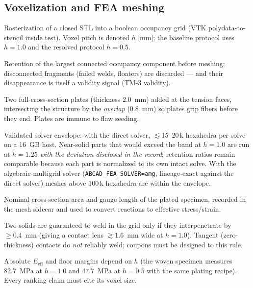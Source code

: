 \documentclass[11pt]{article}
\begin{document}
\subsection{Voxelization and FEA meshing}
\begin{description}[style=nextline,itemsep=0.35em]
  \item[Image-stencil voxelization] Rasterization of a closed STL into a boolean occupancy
    grid (VTK polydata-to-stencil inside test). Voxel pitch is denoted $h$ [mm]; the baseline
    protocol uses $h=1.0$ and the resolved protocol $h=0.5$.
  \item[Keep-largest clean] Retention of the largest connected occupancy component before
    meshing; disconnected fragments (failed welds, floaters) are discarded --- and their
    disappearance is itself a validity signal (TM-3 validity).
  \item[Loading plates / overlap] Two full-cross-section plates (thickness 2.0~mm) added at
    the tension faces, intersecting the structure by the \emph{overlap} (0.8~mm) so plates
    grip fibers before they end. Plates are immune to flaw seeding.
  \item[Hex mesh band] Validated solver envelope: with the direct solver, $\lesssim$15--20\,k
    hexahedra per solve on a 16~GB host. Near-solid parts that would exceed the band at $h=1.0$
    are run at $h=1.25$ \emph{with the deviation disclosed in the record}; retention ratios remain
    comparable because each part is normalized to its own intact solve. With the algebraic-multigrid
    solver (\texttt{ABCAD\_FEA\_SOLVER=amg}, lineage-exact against the direct solver) meshes above
    100\,k hexahedra are within the envelope.
  \item[$A_0$, $H_0$] Nominal cross-section area and gauge length of the plated specimen,
    recorded in the mesh sidecar and used to convert reactions to effective stress/strain.
  \item[Voxel-weld rule] Two solids are guaranteed to weld in the grid only if they
    interpenetrate by $\ge 0.4$~mm (giving a contact lens $\gtrsim 1.6$~mm wide at
    $h=1.0$). Tangent (zero-thickness) contacts do \emph{not} reliably weld; coupons must
    be designed to this rule.
  \item[Resolution dependence] Absolute $E_\mathrm{eff}$ and floor margins depend on $h$ (the woven
    specimen measures 82.7~MPa at $h=1.0$ and 47.7~MPa at $h=0.5$ with the same plating recipe).
    Every ranking claim must cite its voxel size.
\end{description}
\end{document}
